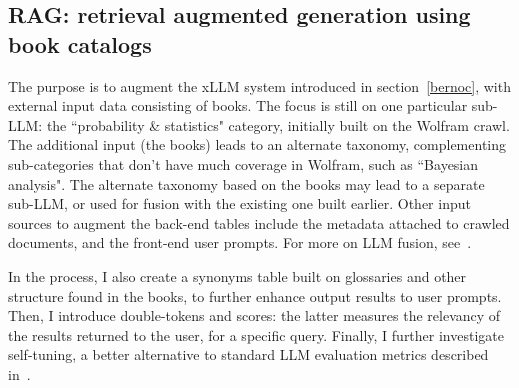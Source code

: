 \documentclass[oneside,10pt]{book}
\begin{document}
\subsection{RAG: retrieval augmented generation using book catalogs}\label{beurreblanc}

The purpose is to augment the \textcolor{index}{xLLM} system introduced in section~\ref{bernoc}, with external input data consisting of books. 
The focus is still on one particular
 sub-LLM: the ``probability \& statistics" category, initially built on the Wolfram crawl.  The additional input (the books) leads to an alternate taxonomy, 
 complementing sub-categories that don't have much coverage in Wolfram, such as ``Bayesian analysis". 
The alternate taxonomy based on the books may lead to a separate sub-LLM, or used for fusion with the existing one built earlier. Other input sources to augment the back-end tables include the metadata attached to crawled documents, and the front-end user prompts. For more on LLM fusion, see~\cite{serg24}.

In the process,  I also create a synonyms table built on glossaries and other structure found in the books, to further enhance output results to user prompts. Then, I  introduce double-tokens and scores: the latter measures the relevancy of the results returned to the user, for a specific query. 
Finally, I further investigate self-tuning, a better alternative to standard LLM evaluation metrics described in~\cite{24erw2}.
\end{document}
